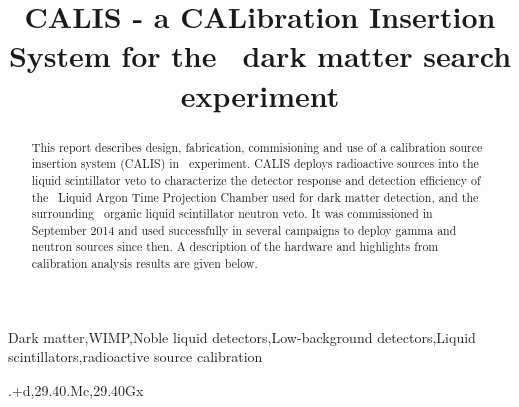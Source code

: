 \documentclass[preprint,12pt]{elsarticle}
\begin{document}
\begin{frontmatter}
\title{CALIS - a CALibration Insertion System for the \dsf\, dark matter search experiment}
%


\begin{abstract}
This report describes design, fabrication, commisioning and use of  a calibration source insertion system (CALIS) in \dsf\ experiment. CALIS  deploys radioactive sources into the liquid scintillator veto to characterize the detector response and detection efficiency of the \dsf\ Liquid Argon Time Projection Chamber used for dark matter detection, and the surrounding \lsvscintillatormass\ organic liquid scintillator neutron veto.
It was commissioned in September 2014 and used successfully in several campaigns to deploy gamma and neutron sources since then. A description of the hardware and highlights from calibration analysis results are given below.


\end{abstract}
\begin{keyword}


Dark matter\sep WIMP\sep Noble liquid detectors\sep Low-background detectors\sep Liquid scintillators\sep radioactive source calibration

.+d\sep 29.40.Mc\sep 29.40Gx

\end{keyword}

\end{frontmatter}
\end{document}
